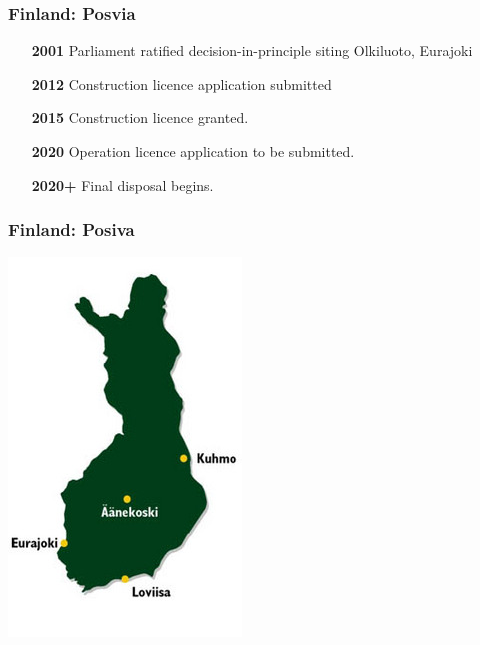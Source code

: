\begin{frame}[c]
\frametitle{Finland: Posvia}

\begin{itemize}
\item[\textbf{2001}]  Parliament ratified decision-in-principle siting Olkiluoto, Eurajoki
\item[\textbf{2012}] Construction licence application submitted
\item[\textbf{2015}] Construction licence granted.
\item[\textbf{2020}] Operation licence application to be submitted.
\item[\textbf{2020+}] Final disposal begins.
\end{itemize}
\end{frame}

\begin{frame}[c]
\frametitle{Finland: Posiva}
\cite{posiva_safety_2017}
\includegraphics[width=\textwidth]{./images/finland-site}
\end{frame}


